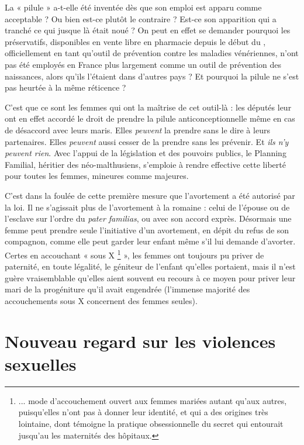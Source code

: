  La « pilule » a-t-elle été inventée dès que son emploi est apparu comme acceptable ? Ou bien est-ce plutôt le contraire ? Est-ce son apparition qui a tranché ce qui jusque là était noué ? On peut en effet se demander pourquoi les préservatifs, disponibles en vente libre en pharmacie depuis le début du , officiellement en tant qu'outil de prévention contre les maladies vénériennes, n'ont pas été employés en France plus largement comme un outil de prévention des naissances, alors qu'ils l'étaient dans d'autres pays ? Et pourquoi la pilule ne s'est pas heurtée à la même réticence ? 

 C'est que ce sont les femmes qui ont la maîtrise de cet outil-là : les députés leur ont en effet accordé le droit de prendre la pilule anticonceptionnelle même en cas de désaccord avec leurs maris. Elles \emph{peuvent} la prendre sans le dire à leurs partenaires. Elles \emph{peuvent} aussi cesser de la prendre sans les prévenir. Et\emph{ ils n'y peuvent rien}. Avec l'appui de la législation et des pouvoirs publics, le Planning Familial, héritier des néo-malthusiens, s'emploie à rendre effective cette liberté pour toutes les femmes, mineures comme majeures. 

 C'est dans la foulée de cette première mesure que l'avortement a été autorisé par la loi. Il ne s'agissait plus de l'avortement à la romaine : celui de l'épouse ou de l'esclave sur l'ordre du \emph{pater familias}, ou avec son accord exprès. Désormais une femme peut prendre seule l'initiative d'un avortement, en dépit du refus de son compagnon, comme elle peut garder leur enfant même s'il lui demande d'avorter. Certes en accouchant « sous X
\footnote{... mode d'accouchement ouvert aux femmes mariées autant qu'aux autres, puisqu'elles n'ont pas à donner leur identité, et qui a des origines très lointaine, dont témoigne la pratique obsessionnelle du secret qui entourait jusqu'au  les maternités des hôpitaux.}
 », les femmes ont toujours pu priver de paternité, en toute légalité, le géniteur de l'enfant qu'elles portaient, mais il n'est guère vraisemblable qu'elles aient souvent eu recours à ce moyen pour priver leur mari de la progéniture qu'il avait engendrée (l'immense majorité des accouchements sous X concernent des femmes seules).

\chapter{Nouveau regard sur les violences sexuelles}

